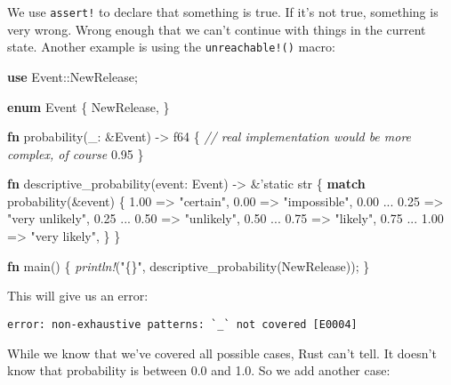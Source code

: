 \documentclass[a4paper,]{book}
\newenvironment{Shaded}{\begin{snugshade}}{\end{snugshade}}
\newcommand{\KeywordTok}[1]{\textcolor[rgb]{0.13,0.29,0.53}{\textbf{{#1}}}}
\newcommand{\DataTypeTok}[1]{\textcolor[rgb]{0.13,0.29,0.53}{{#1}}}
\newcommand{\DecValTok}[1]{\textcolor[rgb]{0.00,0.00,0.81}{{#1}}}
\newcommand{\StringTok}[1]{\textcolor[rgb]{0.31,0.60,0.02}{{#1}}}
\newcommand{\CommentTok}[1]{\textcolor[rgb]{0.56,0.35,0.01}{\textit{{#1}}}}
\newcommand{\OtherTok}[1]{\textcolor[rgb]{0.56,0.35,0.01}{{#1}}}
\newcommand{\PreprocessorTok}[1]{\textcolor[rgb]{0.56,0.35,0.01}{\textit{{#1}}}}
\newcommand{\NormalTok}[1]{{#1}}
\begin{document}
We use \texttt{assert!} to declare that something is true. If it's not
true, something is very wrong. Wrong enough that we can't continue with
things in the current state. Another example is using the
\texttt{unreachable!()} macro:

\begin{Shaded}
\begin{Highlighting}[]
\KeywordTok{use} \NormalTok{Event::NewRelease;}

\KeywordTok{enum} \NormalTok{Event \{}
    \NormalTok{NewRelease,}
\NormalTok{\}}

\KeywordTok{fn} \NormalTok{probability(_: &Event) -> }\DataTypeTok{f64} \NormalTok{\{}
    \CommentTok{// real implementation would be more complex, of course}
    \DecValTok{0.95}
\NormalTok{\}}

\KeywordTok{fn} \NormalTok{descriptive_probability(event: Event) -> &}\OtherTok{'static} \DataTypeTok{str} \NormalTok{\{}
    \KeywordTok{match} \NormalTok{probability(&event) \{}
        \DecValTok{1.00} \NormalTok{=> }\StringTok{"certain"}\NormalTok{,}
        \DecValTok{0.00} \NormalTok{=> }\StringTok{"impossible"}\NormalTok{,}
        \DecValTok{0.00} \NormalTok{... }\DecValTok{0.25} \NormalTok{=> }\StringTok{"very unlikely"}\NormalTok{,}
        \DecValTok{0.25} \NormalTok{... }\DecValTok{0.50} \NormalTok{=> }\StringTok{"unlikely"}\NormalTok{,}
        \DecValTok{0.50} \NormalTok{... }\DecValTok{0.75} \NormalTok{=> }\StringTok{"likely"}\NormalTok{,}
        \DecValTok{0.75} \NormalTok{... }\DecValTok{1.00} \NormalTok{=> }\StringTok{"very likely"}\NormalTok{,}
    \NormalTok{\}}
\NormalTok{\}}

\KeywordTok{fn} \NormalTok{main() \{}
    \PreprocessorTok{println!}\NormalTok{(}\StringTok{"\{\}"}\NormalTok{, descriptive_probability(NewRelease));}
\NormalTok{\}}
\end{Highlighting}
\end{Shaded}

This will give us an error:

\begin{verbatim}
error: non-exhaustive patterns: `_` not covered [E0004]
\end{verbatim}

While we know that we've covered all possible cases, Rust can't tell. It
doesn't know that probability is between 0.0 and 1.0. So we add another
case:
\end{document}
